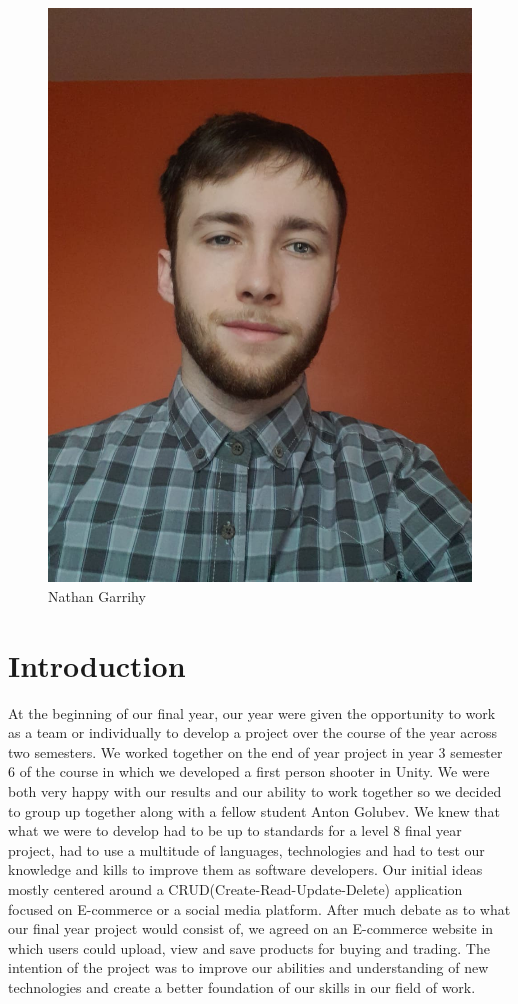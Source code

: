 \begin{figure}[th]
\renewcommand\thefigure{1.2}
\centering
\includegraphics[scale=.14]{img/NathanGarrihy.jpg}
\caption{Nathan Garrihy}
\label{Nathan}
\end{figure}


\newpage
\chapter{Introduction}

At the beginning of our final year, our year were given the opportunity to work as a team or individually to develop a project over the course of the year across two semesters. We worked together on the end of year project in year 3 semester 6 of the course in which we developed a first person shooter in Unity. We were both very happy with our results and our ability to work together so we decided to group up together along with a fellow student Anton Golubev. We knew that what we were to develop had to be up to standards for a level 8 final year project, had to use a multitude of languages, technologies and had to test our knowledge and kills to improve them as software developers. Our initial ideas mostly centered around a CRUD(Create-Read-Update-Delete) application focused on E-commerce or a social media platform. After much debate as to what our final year project would consist of, we agreed on an E-commerce website in which users could upload, view and save products for buying and trading. The intention of the project was to improve our abilities and understanding of new technologies and create a better foundation of our skills in our field of work.

